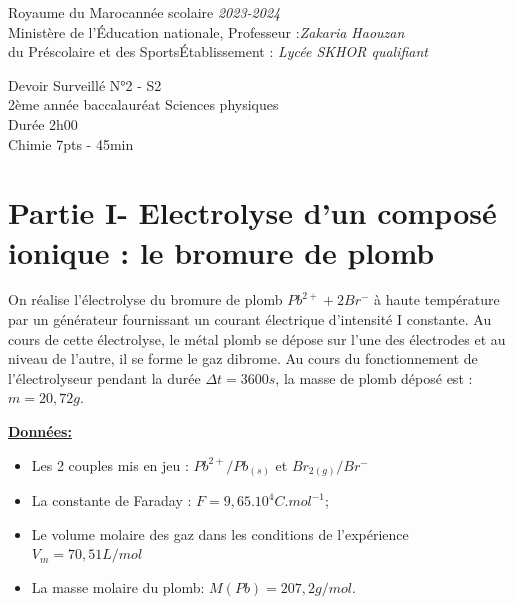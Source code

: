 \documentclass[12pt]{article}
\newcommand\headerMe[2]{\noindent{}#1\hfill#2}
\begin{document}
\headerMe{Royaume du Maroc}{année scolaire \emph{2023-2024}}\\
\headerMe{Ministère de l'Éducation nationale, }{  Professeur :\emph{Zakaria Haouzan}}\\
\headerMe{du Préscolaire et des Sports}{Établissement : \emph{Lycée SKHOR qualifiant}}\\
\begin{center}
Devoir Surveillé  N°2 - S2 \\
    2ème année baccalauréat Sciences physiques\\
Durée 2h00
\\
    \vspace{.2cm}
\hrulefill
\Large{Chimie 7pts - 45min}
\hrulefill\\

\end{center}

 \section*{Partie I- Electrolyse d’un composé ionique : le bromure de plomb}

On réalise l’électrolyse du bromure de plomb $Pb^{2+} + 2Br^- $ à haute température par un générateur
fournissant un courant électrique d’intensité I constante.
Au cours de cette électrolyse, le métal plomb se dépose sur l’une des électrodes et au niveau de
l’autre, il se forme le gaz dibrome.
Au cours du fonctionnement de l’électrolyseur pendant la durée $\Delta{t} =3600s$, la masse de plomb
déposé est : $m = 20,72g$.


\textbf{\underline{Données:}}
\begin{itemize}
  \item Les 2 couples mis en jeu : $Pb^{2+}/Pb_{(s)}$ et $Br_{2(g)}/Br^-$
  \item La constante de Faraday : $F=9,65.10^{4} C.mol^{-1} $;
  \item Le volume molaire des gaz dans les conditions de l’expérience $V_m = 70,51L/mol$
  \item La masse molaire du plomb: $M(Pb) = 207,2 g/mol $.
\end{itemize}
\end{document}

